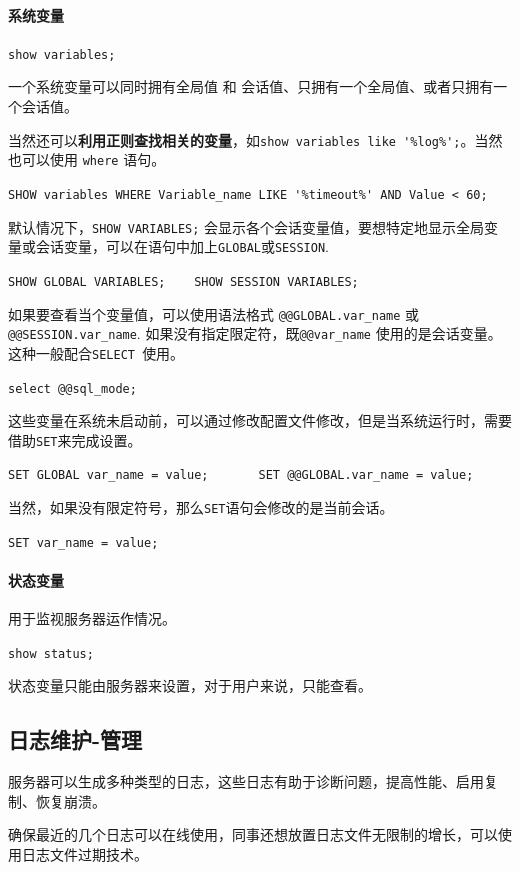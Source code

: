 \documentclass[UTF8,a4paper,12pt]{ctexbook}
\begin{document}
			\paragraph{系统变量}
			
				\verb|show variables;|
				
				一个系统变量可以同时拥有全局值 和 会话值、只拥有一个全局值、或者只拥有一个会话值。
				
				当然还可以\textbf{利用正则查找相关的变量}，如\verb|show variables like '%log%';|。当然也可以使用 \verb|where| 语句。
				
				\verb|SHOW variables WHERE Variable_name LIKE '%timeout%' AND Value < 60;|
				
				默认情况下，\verb|SHOW VARIABLES;| 会显示各个会话变量值，要想特定地显示全局变量或会话变量，可以在语句中加上\verb|GLOBAL|或\verb|SESSION|.
				
				\verb|SHOW GLOBAL VARIABLES; 	SHOW SESSION VARIABLES;|
				
				
				如果要查看当个变量值，可以使用语法格式  \verb|@@GLOBAL.var_name| 或\verb|@@SESSION.var_name|. 如果没有指定限定符，既\verb|@@var_name|  使用的是会话变量。这种一般配合\verb|SELECT |使用。
				
				
				\verb|select @@sql_mode;|
				
				这些变量在系统未启动前，可以通过修改配置文件修改，但是当系统运行时，需要借助\verb|SET|来完成设置。
				
				\verb|SET GLOBAL var_name = value;       SET @@GLOBAL.var_name = value;|
				
				当然，如果没有限定符号，那么\verb|SET|语句会修改的是当前会话。
				
				\verb|SET var_name = value;|
				
			\paragraph{状态变量}用于监视服务器运作情况。
			
				\verb|show status;|
						
				状态变量只能由服务器来设置，对于用户来说，只能查看。
				
				
			
		\subsection{日志维护-管理}
			服务器可以生成多种类型的日志，这些日志有助于诊断问题，提高性能、启用复制、恢复崩溃。
			
			确保最近的几个日志可以在线使用，同事还想放置日志文件无限制的增长，可以使用日志文件过期技术。
			
\end{document}
